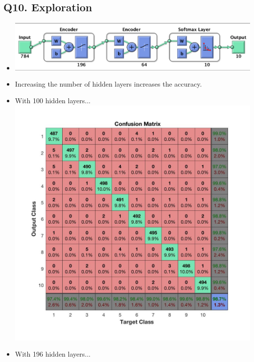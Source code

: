 \documentclass[a4paper,11pt]{article}
\begin{document}
\subsection*{Q10. Exploration}
\begin{itemize}
	\item \includegraphics[scale=0.6]{3} \vfill
	\item Increasing the number of hidden layers increases the accuracy.
	\item With 100 hidden layers...\\ 
	\includegraphics[scale=0.4]{1}\\ \vfill
	\item With 196 hidden layers...\\

\end{itemize}
\end{document}
